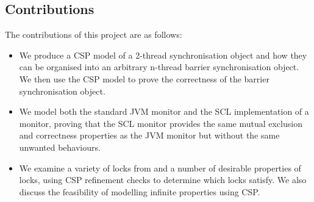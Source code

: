 \subsection{Contributions}

The contributions of this project are as follows:

\begin{itemize}
  \item We produce a CSP model of a 2-thread synchronisation object and how they can be organised into an arbitrary n-thread barrier synchronisation object. We then use the CSP model to prove the correctness of the barrier synchronisation object.
  \item We model both the standard JVM monitor and the SCL\cite{CP} implementation of a monitor, proving that the SCL monitor provides the same mutual exclusion and correctness properties as the JVM monitor but without the same unwanted behaviours.
  \item We examine a variety of locks from \cite{CADS} and a number of desirable properties of locks, using CSP refinement checks to determine which locks satisfy. We also discuss the feasibility of modelling infinite properties using CSP.
\end{itemize}



